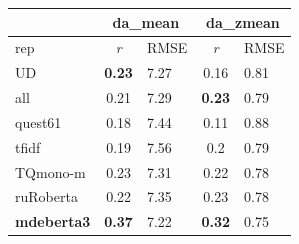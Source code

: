 \begin{table}[H]
	\centering
	\begin{tabular}{l|cl|cl}
		\toprule
		& \multicolumn{2}{c|}{da\_mean} & \multicolumn{2}{c}{da\_zmean} \\
		\midrule
		rep             & \textit{r}         & RMSE & \textit{r}          & RMSE \\
		\midrule
			UD              & \textbf{0.23} & 7.27 & 0.16 & 0.81 \\
			all             & 0.21 & 7.29 & \textbf{0.23} & 0.79 \\
			quest61         & 0.18 & 7.44 & 0.11 & 0.88 \\
			\midrule
			tfidf           & 0.19 & 7.56 & 0.2  & 0.79 \\
			\midrule
			TQmono-m        & 0.23 & 7.31 & 0.22 & 0.78 \\
			ruRoberta & 0.22 & 7.35 & 0.23 & 0.78 \\
			\textbf{mdeberta3}  & \boxit{0.4in}\textbf{0.37} & 7.22 & \textbf{0.32} & 0.75 \\

\end{tabular}
\end{table}
